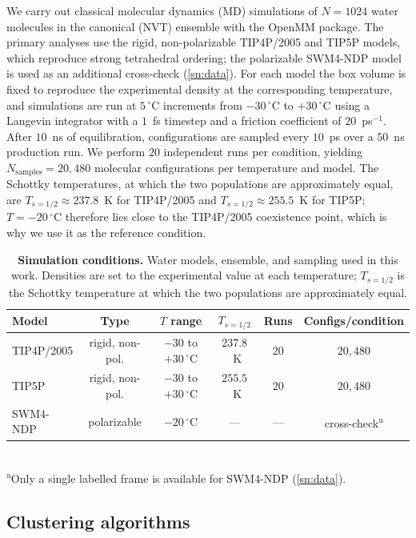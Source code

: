 \documentclass[aps,amsmath,amssymb,onecolumn,superscriptaddress,nofootinbib]{revtex4-2}
\begin{document}
We carry out classical molecular dynamics (MD) simulations of $N=1024$ water
molecules in the canonical (NVT) ensemble with the OpenMM
package. The primary analyses use the rigid,
non-polarizable TIP4P/2005 and
TIP5P models, which reproduce strong tetrahedral
ordering; the polarizable SWM4-NDP model is used as an
additional cross-check (\ref{sn:data}). For each model the
box volume is fixed to reproduce the experimental density at the corresponding
temperature, and simulations are run at $5\,^{\circ}$C increments from
$-30\,^{\circ}$C to $+30\,^{\circ}$C using a Langevin integrator with a
$1$~fs timestep and a friction coefficient of $20$~ps$^{-1}$. After $10$~ns of
equilibration, configurations are sampled every $10$~ps over a $50$~ns
production run. We perform $20$ independent runs per condition, yielding
$N_{\mathrm{samples}} = 20{,}480$ molecular configurations per temperature and
model. The Schottky temperatures, at which the two populations are
approximately equal, are $T_{s=1/2}\approx 237.8$~K for TIP4P/2005 and
$T_{s=1/2}\approx 255.5$~K for TIP5P; $T=-20\,^{\circ}$C
therefore lies close to the TIP4P/2005 coexistence point, which is why we use it
as the reference condition.

\begin{table}[t]
  \centering
  \caption{\textbf{Simulation conditions.} Water models, ensemble, and sampling
  used in this work. Densities are set to the experimental value at each
  temperature; $T_{s=1/2}$ is the Schottky temperature at which the two
  populations are approximately equal.}
  \label{tab:conditions}
  \begin{tabular}{lccccc}
    \toprule
    Model & Type & $T$ range & $T_{s=1/2}$ & Runs & Configs/condition \\
    \midrule
    TIP4P/2005 & rigid, non-pol. & $-30$ to $+30\,^{\circ}$C & $237.8$~K & 20 & $20{,}480$ \\
    TIP5P      & rigid, non-pol. & $-30$ to $+30\,^{\circ}$C & $255.5$~K & 20 & $20{,}480$ \\
    SWM4-NDP   & polarizable     & $-20\,^{\circ}$C          & ---       & --- & cross-check\textsuperscript{a} \\
    \bottomrule
  \end{tabular}
  \\[2pt]
  {\footnotesize \textsuperscript{a}Only a single labelled frame is available for
  SWM4-NDP (\ref{sn:data}).}
\end{table}

\subsection{Clustering algorithms}
\label{sn:clustering}
\end{document}
